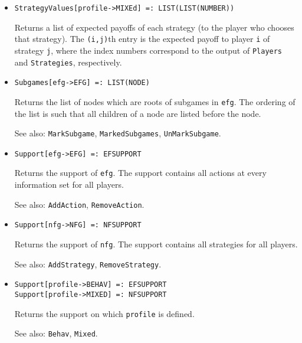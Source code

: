 \begin{itemize}
\item{}
\protect \large \begin{verbatim}
StrategyValues[profile->MIXEd] =: LIST(LIST(NUMBER)) 
\end{verbatim}\normalsize

\bd
Returns a list of expected payoffs of each strategy (to the player
who chooses that strategy).  The \verb+(i,j)+th entry is
the expected payoff to player \verb+i+ of
strategy \verb+j+, where the index numbers correspond to the output of
\verb+Players+ and \verb+Strategies+, respectively.
\ed

\item{}
\protect \large \begin{verbatim}
Subgames[efg->EFG] =: LIST(NODE) 
\end{verbatim}\normalsize

\bd
Returns the list of nodes which are roots of subgames in \verb+efg+.
The ordering of the list is such that
all children of a node are listed before the node.
\item [See also:] \verb+MarkSubgame+, \verb+MarkedSubgames+, 
\verb+UnMarkSubgame+.
\ed

\item{}
\protect \large \begin{verbatim}
Support[efg->EFG] =: EFSUPPORT 
\end{verbatim}\normalsize

\bd
Returns the support of \verb+efg+.  The support contains all actions at every
information set for all players.
\item [See also:] \verb+AddAction+, \verb+RemoveAction+.
\ed

\item{}
\protect \large \begin{verbatim}
Support[nfg->NFG] =: NFSUPPORT 
\end{verbatim}\normalsize

\bd
Returns the support of \verb+nfg+.  The support contains all strategies
for all players.
\item [See also:] \verb+AddStrategy+, \verb+RemoveStrategy+.
\ed

\item{}
\protect \large \begin{verbatim}
Support[profile->BEHAV] =: EFSUPPORT 
Support[profile->MIXED] =: NFSUPPORT 
\end{verbatim}\normalsize

\bd
Returns the support on which \verb+profile+ is defined.
\item [See also:] \verb+Behav+, \verb+Mixed+.
\ed


\end{itemize}
